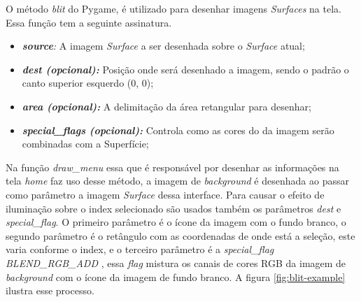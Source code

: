 O método \textit{blit} do Pygame, é utilizado para desenhar imagens \textit{Surfaces} na tela. Essa função tem a seguinte assinatura.
\begin{itemize}
    \item \textit{\textbf{source}:} A imagem \textit{Surface} a ser desenhada sobre o \textit{Surface} atual;
    \item \textit{\textbf{dest (opcional):}} Posição onde será desenhado a imagem, sendo o padrão o canto superior esquerdo (0, 0);
    \item \textit{\textbf{area (opcional):}} A delimitação da área retangular para desenhar;
    \item \textit{\textbf{special\_flags (opcional):}} Controla como as cores do da imagem serão combinadas com a Superfície;
\end{itemize}

Na função \textit{draw\_menu} essa que é responsável por desenhar as informações na tela \textit{home} faz uso desse método, a imagem de \textit{background} é desenhada ao passar como parâmetro a imagem \textit{Surface} dessa interface. Para causar o efeito de iluminação sobre o index selecionado são usados também os parâmetros \textit{dest} e \textit{special\_flag}. O primeiro parâmetro é o ícone da imagem com o fundo branco, o segundo parâmetro é o retângulo com as coordenadas de onde está a seleção, este varia conforme o index, e o terceiro parâmetro é a \textit{special\_flag} \textit{BLEND\_RGB\_ADD }, essa \textit{flag} mistura os canais de cores RGB da imagem de \textit{background} com o ícone da imagem de fundo branco. A figura \ref{fig:blit-example} ilustra esse processo.


